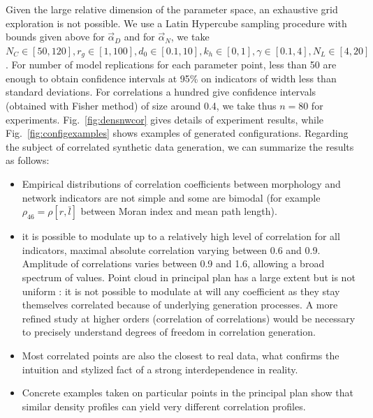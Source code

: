 \documentclass{article}
\begin{document}
Given the large relative dimension of the parameter space, an exhaustive grid exploration is not possible. We use a Latin Hypercube sampling procedure with bounds given above for $\vec{\alpha}_D$ and for $\vec{\alpha}_N$, we take $N_C \in [50,120], r_g \in [1,100] , d_0 \in [0.1,10] , k_h \in [0,1] , \gamma \in [0.1,4],N_L\in [4,20]$. For number of model replications for each parameter point, less than 50 are enough to obtain confidence intervals at 95\% on indicators of width less than standard deviations. For correlations a hundred give confidence intervals (obtained with Fisher method) of size around 0.4, we take thus $n=80$ for experiments. Fig.~\ref{fig:densnwcor} gives details of experiment results, while Fig.~\ref{fig:configexamples} shows examples of generated configurations. Regarding the subject of correlated synthetic data generation, we can summarize the results as follows:
\begin{itemize}
\item Empirical distributions of correlation coefficients between morphology and network indicators are not simple and some are bimodal (for example $\rho_{46}=\rho[r,\bar{l}]$  between Moran index and mean path length).
\item it is possible to modulate up to a relatively high level of correlation for all indicators, maximal absolute correlation varying between 0.6 and 0.9. Amplitude of correlations varies between 0.9 and 1.6, allowing a broad spectrum of values. Point cloud in principal plan has a large extent but is not uniform : it is not possible to modulate at will any coefficient as they stay themselves correlated because of underlying generation processes. A more refined study at higher orders (correlation of correlations) would be necessary to precisely understand degrees of freedom in correlation generation.
\item Most correlated points are also the closest to real data, what confirms the intuition and stylized fact of a strong interdependence in reality.
\item Concrete examples taken on particular points in the principal plan show that similar density profiles can yield very different correlation profiles.
\end{itemize}



\end{document}
